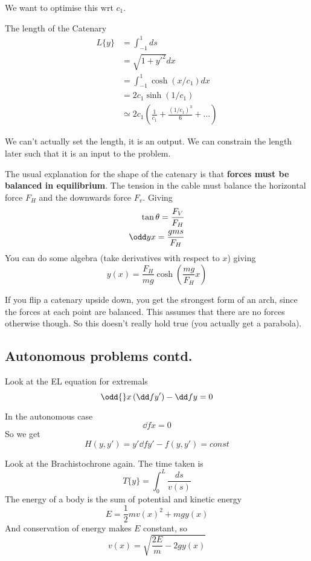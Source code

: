 \documentclass{E:/Documents/Latex/myassignment}
\begin{document}
We want to optimise this wrt $c_1$.

The length of the Catenary 
\begin{align*}
	L\{y\} &= \int_{-1}^1 ds\\
	&= \sqrt{1+y'^2} dx\\
	&= \int_{-1}^1 \cosh(x/c_1) dx\\
	&= 2c_1 \sinh(1/c_1)\\
	&\simeq 2c_1(\frac{1}{c_1} + \frac{(1/c_1)^3}{6} + \ldots)
\end{align*}

We can't actually set the length, it is an output. We can constrain the length later such that it is an input to the problem.

The usual explanation for the shape of the catenary is that \textbf{forces must be balanced in equilibrium}.
The tension in the cable must balance the horizontal force $F_H$ and the downwards force $F_v$. Giving
\begin{align*}
	\tan \theta = \frac{F_V}{F_H}\\
	\odd yx = \frac{gms}{F_H}
\end{align*}
You can do some algebra (take derivatives with respect to $x$) giving
\[y(x) = \frac{F_H}{mg} \cosh\left(\frac{mg}{F_H}x\right)\]

If you flip a catenary upside down, you get the strongest form of an arch, since the forces at each point are balanced. This assumes that there are no forces otherwise though. So this doesn't really hold true (you actually get a parabola).



\subsection{Autonomous problems contd.}

Look at the EL equation for extremals
\[\odd{}x \left(\dd f{y'}\right) - \dd fy = 0\]

In the autonomous case 
\[\dd fx = 0\]
So we get
\[H(y,y') = y' \dd f{y'} - f(y,y') = const\]

Look at the Brachistochrone again. The time taken is
\[T\{y\} = \int_0^L \frac{ds}{v(s)}\]
The energy of a body is the sum of potential and kinetic energy
\[E = \frac12 mv(x)^2 + mgy(x)\]
And conservation of energy makes $E$ constant, so
\[v(x) = \sqrt{\frac{2E}{m} - 2gy(x)}\]
\end{document}
